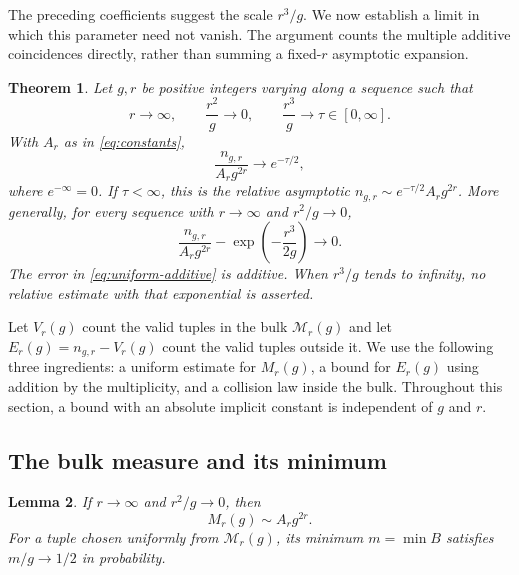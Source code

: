 \documentclass[11pt]{article}
\newtheorem{theorem}{Theorem}[section]
\newtheorem{lemma}[theorem]{Lemma}
\theoremstyle{remark}\newtheorem{remark}[theorem]{Remark}
\begin{document}
The preceding coefficients suggest the scale $r^3/g$. We now establish a
limit in which this parameter need not vanish. The argument counts the
multiple additive coincidences directly, rather than summing a fixed-$r$
asymptotic expansion.

\begin{theorem}\label{thm:uniform}
Let $g,r$ be positive integers varying along a sequence such that
\[
r\longrightarrow\infty,\qquad \frac{r^2}{g}\longrightarrow0,
\qquad \frac{r^3}{g}\longrightarrow\tau\in[0,\infty].
\]
With $A_r$ as in \eqref{eq:constants},
\begin{equation}\label{eq:uniform-limit}
\frac{n_{g,r}}{A_rg^{2r}}\longrightarrow e^{-\tau/2},
\end{equation}
where $e^{-\infty}=0$. If $\tau<\infty$, this is the relative asymptotic
$n_{g,r}\sim e^{-\tau/2}A_rg^{2r}$. More generally, for every sequence
with $r\to\infty$ and $r^2/g\to0$,
\begin{equation}\label{eq:uniform-additive}
\frac{n_{g,r}}{A_rg^{2r}}-\exp\left(-\frac{r^3}{2g}\right)
\longrightarrow0.
\end{equation}
The error in \eqref{eq:uniform-additive} is additive. When $r^3/g$ tends
to infinity, no relative estimate with that exponential is asserted.
\end{theorem}

Let $V_r(g)$ count the valid tuples in the bulk $\mathcal M_r(g)$ and
let $E_r(g)=n_{g,r}-V_r(g)$ count the valid tuples outside it. We use the
following three ingredients: a uniform estimate for $M_r(g)$, a bound
for $E_r(g)$ using addition by the multiplicity, and a collision law
inside the bulk. Throughout this section, a bound with an absolute
implicit constant is independent of $g$ and $r$.

\subsection{The bulk measure and its minimum}

\begin{lemma}\label{lem:uniform-bulk}
If $r\to\infty$ and $r^2/g\to0$, then
\begin{equation}\label{eq:uniform-M}
M_r(g)\sim A_rg^{2r}.
\end{equation}
For a tuple chosen uniformly from $\mathcal M_r(g)$, its minimum
$m=\min B$ satisfies $m/g\to1/2$ in probability.
\end{lemma}
\end{document}
